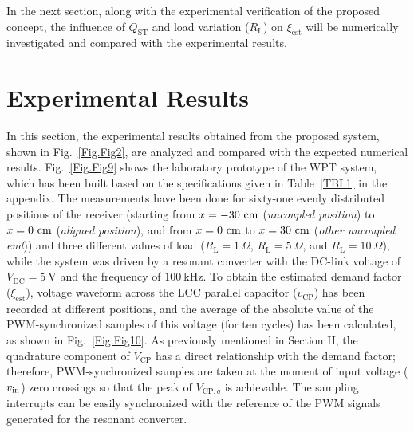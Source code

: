 \documentclass[journal,a4paper]{IEEEtran}
\begin{document}
In the next section, along with the experimental verification of the proposed concept, the influence of $Q_{\textrm{ST}}$ and load variation ($R_{\mathrm{L}}$) on $\xi_{\mathrm{est}}$ will be numerically investigated and compared with the experimental results.

\section{Experimental Results}
In this section, the  experimental results obtained from the proposed system, shown in Fig.~\ref{Fig.Fig2}, are analyzed and compared with the expected numerical results. Fig.~\ref{Fig.Fig9} shows the laboratory prototype of the WPT system, which has been built based on the specifications given in Table~\ref{TBL1} in the appendix.
The measurements have been done for sixty-one evenly distributed positions of the receiver (starting from $x =-30~\rm{cm}$ (\textit{uncoupled position}) to $x= 0~\rm{cm}$ (\textit{aligned position}), and from $x= 0~\rm{cm}$ to $x= 30~\rm{cm}$ (\textit{other uncoupled end})) and three different values of load ($R_{\mathrm{L}} = 1~\Omega$, $R_{\mathrm{L}} = 5~\Omega$, and $R_{\mathrm{L}} = 10~\Omega$), while the system was driven by a resonant converter with the DC-link voltage of $V_{\mathrm{DC}}=5~\mathrm{V}$ and the frequency of $100~\mathrm{kHz}$. 
To obtain the estimated demand factor ($\xi_{\mathrm{est}}$), voltage waveform across the LCC parallel capacitor ($v_{\mathrm{CP}}$) has been recorded at different positions, and the average of the absolute value of the PWM-synchronized samples of this voltage (for ten cycles) has been calculated, as shown in Fig.~\ref{Fig.Fig10}. As previously mentioned in Section II, the quadrature component of $V_{\mathrm{CP}}$ has a direct relationship with the demand factor; therefore, PWM-synchronized samples are taken at the moment of input voltage ($v_{\rm in}$) zero crossings so that the peak of $V_{\mathrm{CP},q}$ is achievable. The sampling interrupts can be easily synchronized with the reference of the PWM signals generated for the resonant converter.
\end{document}
